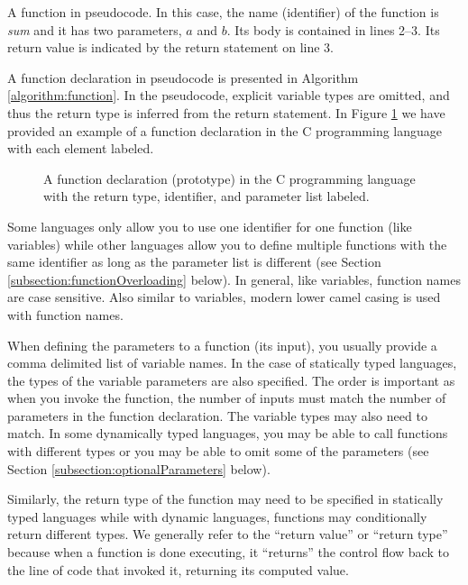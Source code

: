 \begin{algorithm}[H]
\caption[A function in pseudocode]{A function in pseudocode.  In this case, the name (identifier) of
the function is \emph{sum} and it has two parameters, $a$ and $b$.  Its
body is contained in lines 2--3.  Its return value is indicated by the return
statement on line 3.}
\label{algorithm:function}
\end{algorithm}

A function declaration in pseudocode is presented in Algorithm 
\ref{algorithm:function}.  In the pseudocode, explicit variable types
are omitted, and thus the return type is inferred from the return statement.
In Figure \ref{figure:cFunctionPrototype} we have provided an example
of a function declaration in the C programming language with each
element labeled. 

\begin{figure}[H]
\centering

\caption{A function declaration (prototype) in the C programming language
with the return type, identifier, and parameter list labeled.}
\label{figure:cFunctionPrototype}
\end{figure}

Some languages only allow you to use one identifier for one function 
(like variables) while other languages allow you to define multiple functions
with the same identifier as long as the parameter list is different (see
Section \ref{subsection:functionOverloading} below).  In general, like variables, function names
are case sensitive.  Also similar to variables, modern lower camel casing
is used with function names.  

When defining the parameters to a function (its input), you usually provide
a comma delimited list of variable names.  In the case of statically typed
languages, the types of the variable parameters are also specified.  The
order is important as when you invoke the function, the number of inputs
must match the number of parameters in the function declaration.  The 
variable types may also need to match.  In some dynamically typed languages, 
you may be able to call functions with different types or you may be able
to omit some of the parameters (see Section \ref{subsection:optionalParameters}
below).

Similarly, the return type of the function may need to be specified in 
statically typed languages while with dynamic languages, functions may
conditionally return different types.  We generally refer to the ``return value''
or ``return type'' because when a function is done executing, it ``returns''
the control flow back to the line of code that invoked it, returning its
computed value.

